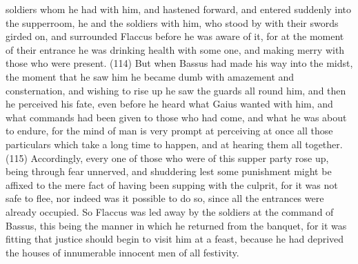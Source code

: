 soldiers whom he had with him, and hastened forward, and entered suddenly into the supperroom,
he and the soldiers with him, who stood by with their swords girded on, and surrounded Flaccus
before he was aware of it, for at the moment of their entrance he was drinking health with some
one, and making merry with those who were present. (114) But when Bassus had made his way
into the midst, the moment that he saw him he became dumb with amazement and consternation,
and wishing to rise up he saw the guards all round him, and then he perceived his fate, even before
he heard what Gaius wanted with him, and what commands had been given to those who had
come, and what he was about to endure, for the mind of man is very prompt at perceiving at once
all those particulars which take a long time to happen, and at hearing them all together. (115)
Accordingly, every one of those who were of this supper party rose up, being through fear
unnerved, and shuddering lest some punishment might be affixed to the mere fact of having been
supping with the culprit, for it was not safe to flee, nor indeed was it possible to do so, since all the
entrances were already occupied. So Flaccus was led away by the soldiers at the command of
Bassus, this being the manner in which he returned from the banquet, for it was fitting that justice
should begin to visit him at a feast, because he had deprived the houses of innumerable innocent
men of all festivity.

